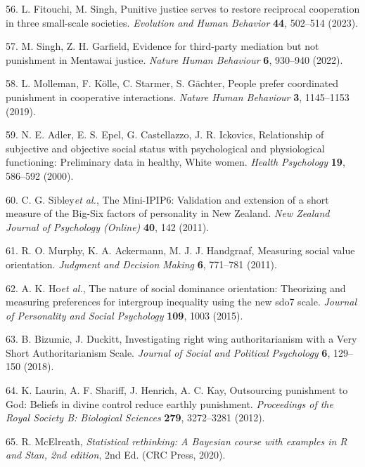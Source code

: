 \documentclass[
  english,
  man, donotrepeattitle,floatsintext]{apa6}
\newenvironment{cslreferences}%
  {}%
  {\par}
\begin{document}
\begin{cslreferences}
\leavevmode\hypertarget{ref-Fitouchi2023}{}%
56. L. Fitouchi, M. Singh, Punitive justice serves to restore reciprocal cooperation in three small-scale societies. \emph{Evolution and Human Behavior} \textbf{44}, 502--514 (2023).

\leavevmode\hypertarget{ref-Singh2022}{}%
57. M. Singh, Z. H. Garfield, Evidence for third-party mediation but not punishment in Mentawai justice. \emph{Nature Human Behaviour} \textbf{6}, 930--940 (2022).

\leavevmode\hypertarget{ref-Molleman2019}{}%
58. L. Molleman, F. Kölle, C. Starmer, S. Gächter, People prefer coordinated punishment in cooperative interactions. \emph{Nature Human Behaviour} \textbf{3}, 1145--1153 (2019).

\leavevmode\hypertarget{ref-Adler2000}{}%
59. N. E. Adler, E. S. Epel, G. Castellazzo, J. R. Ickovics, Relationship of subjective and objective social status with psychological and physiological functioning: Preliminary data in healthy, White women. \emph{Health Psychology} \textbf{19}, 586--592 (2000).

\leavevmode\hypertarget{ref-Sibley2011}{}%
60. C. G. Sibley\emph{et al.}, The Mini-IPIP6: Validation and extension of a short measure of the Big-Six factors of personality in New Zealand. \emph{New Zealand Journal of Psychology (Online)} \textbf{40}, 142 (2011).

\leavevmode\hypertarget{ref-Murphy2011}{}%
61. R. O. Murphy, K. A. Ackermann, M. J. J. Handgraaf, Measuring social value orientation. \emph{Judgment and Decision Making} \textbf{6}, 771--781 (2011).

\leavevmode\hypertarget{ref-Ho2015}{}%
62. A. K. Ho\emph{et al.}, The nature of social dominance orientation: Theorizing and measuring preferences for intergroup inequality using the new sdo7 scale. \emph{Journal of Personality and Social Psychology} \textbf{109}, 1003 (2015).

\leavevmode\hypertarget{ref-Bizumic2018}{}%
63. B. Bizumic, J. Duckitt, Investigating right wing authoritarianism with a Very Short Authoritarianism Scale. \emph{Journal of Social and Political Psychology} \textbf{6}, 129--150 (2018).

\leavevmode\hypertarget{ref-Laurin2012}{}%
64. K. Laurin, A. F. Shariff, J. Henrich, A. C. Kay, Outsourcing punishment to God: Beliefs in divine control reduce earthly punishment. \emph{Proceedings of the Royal Society B: Biological Sciences} \textbf{279}, 3272--3281 (2012).

\leavevmode\hypertarget{ref-McElreath2020}{}%
65. R. McElreath, \emph{Statistical rethinking: A Bayesian course with examples in R and Stan, 2nd edition}, 2nd Ed. (CRC Press, 2020).


\end{cslreferences}
\end{document}
